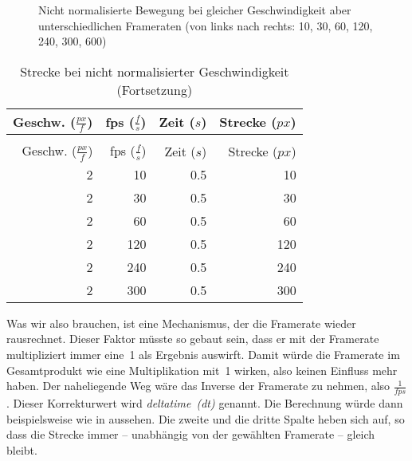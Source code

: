 \begin{figure}[hbtp] 
\begin{center}
	\caption[Nicht normalisierte Bewegung]{Nicht normalisierte Bewegung bei gleicher Geschwindigkeit aber unterschiedlichen Frameraten (von links nach rechts: 10, 30, 60, 120, 240, 300, 600)}\label{fpsbewegung00}
\end{center}
\end{figure}

\begin{longtable}{r@{ * }r@{ * }r@{ = }r}
	\caption{Strecke bei nicht normalisierter Geschwindigkeit}\label{tabFpsBewegung01} \\[1em]
    Geschw. ($\frac{px}{f}$) & fps ($\frac{f}{s}$) & Zeit ($s$)& Strecke ($px$) \\[0.5em]\hline\hline
	\hline
	\endfirsthead %
	\caption{Strecke bei nicht normalisierter Geschwindigkeit (Fortsetzung)}\\[1em]
	Geschw. ($\frac{px}{f}$) & fps ($\frac{f}{s}$) & Zeit ($s$)& Strecke ($px$)\\[0.5em]\hline\hline
	\hline
	\endhead %
	2  &   10 & 0.5 &  10 \\ \hline
	2  &   30 & 0.5 &  30 \\ \hline
	2  &   60 & 0.5 &  60 \\ \hline
	2  &  120 & 0.5 & 120 \\ \hline
	2  &  240 & 0.5 & 240 \\ \hline
	2  &  300 & 0.5 & 300 \\ \hline
\end{longtable} 

Was wir also brauchen, ist eine Mechanismus, der die Framerate wieder rausrechnet. Dieser Faktor müsste so gebaut sein, dass er mit der Framerate multipliziert immer eine~1 als Ergebnis auswirft. Damit würde die Framerate im Gesamtprodukt wie eine Multiplikation mit~1 wirken, also keinen Einfluss mehr haben. Der naheliegende Weg wäre das Inverse der Framerate zu nehmen, also $\frac{1}{fps}$. Dieser Korrekturwert wird \emph{deltatime~(dt)} genannt. Die Berechnung würde dann beispielsweise wie in  aussehen. Die zweite und die dritte Spalte heben sich auf, so dass die Strecke immer -- unabhängig von der gewählten Framerate -- gleich bleibt. 

